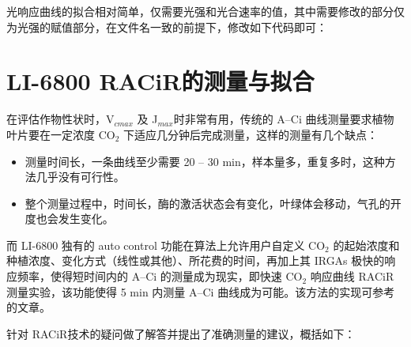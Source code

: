 \documentclass[
]{krantz}
\makeatletter
\newenvironment{Shaded}{\begin{snugshade}}{\end{snugshade}}
\newcommand{\NormalTok}[1]{#1}
\newcommand{\OperatorTok}[1]{\textcolor[rgb]{0.81,0.36,0.00}{\textbf{#1}}}
\newcommand{\StringTok}[1]{\textcolor[rgb]{0.31,0.60,0.02}{#1}}
\providecommand{\tightlist}{%
  \setlength{\itemsep}{0pt}\setlength{\parskip}{0pt}}
\newenvironment{kframe}{%
\medskip{}
\setlength{\fboxsep}{.8em}
 \def\at@end@of@kframe{}%
 \ifinner\ifhmode%
  \def\at@end@of@kframe{\end{minipage}}%
  \begin{minipage}{\columnwidth}%
 \fi\fi%
 \def\FrameCommand##1{\hskip\@totalleftmargin \hskip-\fboxsep
 \colorbox{shadecolor}{##1}\hskip-\fboxsep
     \hskip-\linewidth \hskip-\@totalleftmargin \hskip\columnwidth}%
 \MakeFramed {\advance\hsize-\width
   \@totalleftmargin\z@ \linewidth\hsize
   \@setminipage}}%
 {\par\unskip\endMakeFramed%
 \at@end@of@kframe}
\renewenvironment{Shaded}{\begin{kframe}}{\end{kframe}}
\makeatother
\begin{document}
光响应曲线的拟合相对简单，仅需要光强和光合速率的值，其中需要修改的部分仅为光强的赋值部分，在文件名一致的前提下，修改如下代码即可：

\begin{Shaded}
\end{Shaded}

\cleardoublepage

\hypertarget{racir68}{%
\section{\texorpdfstring{LI-6800 RACiR\texttrademark 的测量与拟合}{LI-6800 RACiR的测量与拟合}}\label{racir68}}

在评估作物性状时，V\(_{cmax}\) 及 J\(_{max}\)时非常有用，传统的 A--Ci 曲线测量要求植物叶片要在一定浓度 CO\(_{2}\)
下适应几分钟后完成测量，这样的测量有几个缺点：

\begin{itemize}
\tightlist
\item
  测量时间长，一条曲线至少需要 20 -- 30 min，样本量多，重复多时，这种方法几乎没有可行性。
\item
  整个测量过程中，时间长，酶的激活状态会有变化，叶绿体会移动，气孔的开度也会发生变化。
\end{itemize}

而 LI-6800 独有的 auto control 功能在算法上允许用户自定义 CO\(_{2}\) 的起始浓度和种植浓度、变化方式（线性或其他）、所花费的时间，再加上其
IRGAs 极快的响应频率，使得短时间内的 A--Ci 的测量成为现实，即快速 CO\(_{2}\) 响应曲线 RACiR\texttrademark
测量实验，该功能使得 5 min 内测量 A--Ci 曲线成为可能。该方法的实现可参考 \citet{stinziano2017}
的文章。

\citet{stinziano2018} 针对 RACiR\texttrademark 技术的疑问做了解答并提出了准确测量的建议，概括如下：
\end{document}

